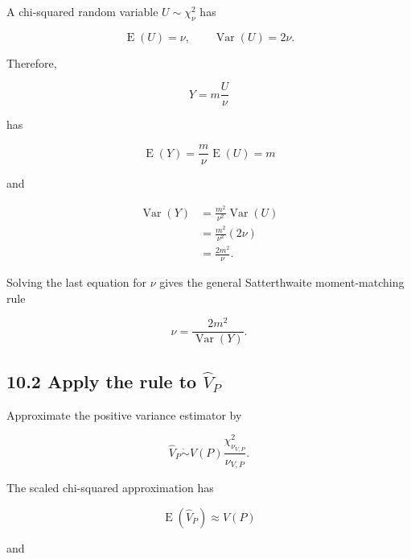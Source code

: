 \documentclass[
  11pt]{article}
\begin{document}
A chi-squared random variable \(U\sim\chi^2_\nu\) has

\begin{equation}
\operatorname E(U)=\nu,
\qquad
\operatorname{Var}(U)=2\nu.
\end{equation}

Therefore,

\begin{equation}
Y=m\frac{U}{\nu}
\end{equation}

has

\begin{equation}
\operatorname E(Y)
=\frac{m}{\nu}\operatorname E(U)
=m
\end{equation}

and

\begin{equation}
\begin{aligned}
\operatorname{Var}(Y)
&=\frac{m^2}{\nu^2}\operatorname{Var}(U)\\
&=\frac{m^2}{\nu^2}(2\nu)\\
&=\frac{2m^2}{\nu}.
\end{aligned}
\end{equation}

Solving the last equation for \(\nu\) gives the general Satterthwaite
moment-matching rule

\begin{equation}
\boxed{
\nu=\frac{2m^2}{\operatorname{Var}(Y)}.
}
\end{equation}

\subsection{\texorpdfstring{10.2 Apply the rule to
\(\widehat V_P\)}{10.2 Apply the rule to \textbackslash widehat V\_P}}\label{apply-the-rule-to-widehat-v_p}

Approximate the positive variance estimator by

\begin{equation}
\widehat V_P
\mathrel{\dot\sim}
V(P)\frac{\chi^2_{\nu_{V,P}}}{\nu_{V,P}}.
\end{equation}

The scaled chi-squared approximation has

\begin{equation}
\operatorname E(\widehat V_P)\approx V(P)
\end{equation}

and
\end{document}
